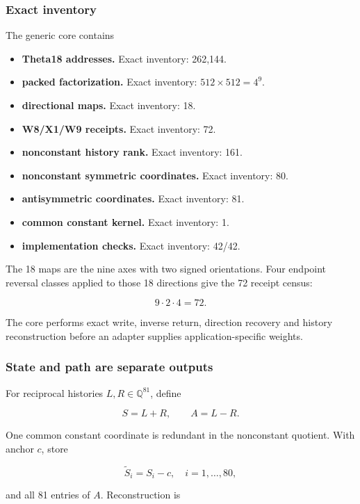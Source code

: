 \subsubsection{Exact inventory}\label{viii-ch06-exact-inventory}

The generic core contains

\begin{itemize}
\tightlist
\item
  \textbf{Theta18 addresses.} Exact inventory: 262,144.
\item
  \textbf{packed factorization.} Exact inventory: \(512\times512=4^9\).
\item
  \textbf{directional maps.} Exact inventory: 18.
\item
  \textbf{W8/X1/W9 receipts.} Exact inventory: 72.
\item
  \textbf{nonconstant history rank.} Exact inventory: 161.
\item
  \textbf{nonconstant symmetric coordinates.} Exact inventory: 80.
\item
  \textbf{antisymmetric coordinates.} Exact inventory: 81.
\item
  \textbf{common constant kernel.} Exact inventory: 1.
\item
  \textbf{implementation checks.} Exact inventory: 42/42.
\end{itemize}

The 18 maps are the nine axes with two signed orientations. Four
endpoint reversal classes applied to those 18 directions give the 72
receipt census:

\[
9\cdot2\cdot4=72.
\]

The core performs exact write, inverse return, direction recovery and
history reconstruction before an adapter supplies application-specific
weights.

\subsubsection{State and path are separate
outputs}\label{viii-ch06-state-and-path-are-separate-outputs}

For reciprocal histories \(L,R\in\mathbb Q^{81}\), define

\[
S=L+R,
\qquad
A=L-R.
\]

One common constant coordinate is redundant in the nonconstant quotient.
With anchor \(c\), store

\[
\widetilde S_i=S_i-c,\quad i=1,\ldots,80,
\]

and all 81 entries of \(A\). Reconstruction is

